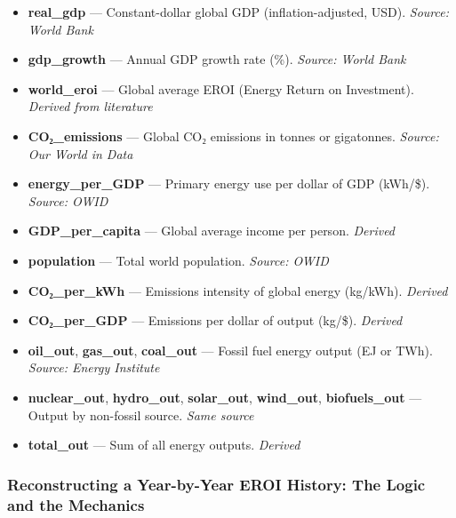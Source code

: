 \documentclass[a4paper,12pt]{article}
\begin{document}
\begin{itemize}
    \item \textbf{real\_gdp} — Constant-dollar global GDP (inflation-adjusted, USD). \textit{Source: World Bank}
    \item \textbf{gdp\_growth} — Annual GDP growth rate (\%). \textit{Source: World Bank}
    \item \textbf{world\_eroi} — Global average EROI (Energy Return on Investment). \textit{Derived from literature}
    \item \textbf{CO₂\_emissions} — Global CO₂ emissions in tonnes or gigatonnes. \textit{Source: Our World in Data}
    \item \textbf{energy\_per\_GDP} — Primary energy use per dollar of GDP (kWh/\$). \textit{Source: OWID}
    \item \textbf{GDP\_per\_capita} — Global average income per person. \textit{Derived}
    \item \textbf{population} — Total world population. \textit{Source: OWID}
    \item \textbf{CO₂\_per\_kWh} — Emissions intensity of global energy (kg/kWh). \textit{Derived}
    \item \textbf{CO₂\_per\_GDP} — Emissions per dollar of output (kg/\$). \textit{Derived}
    \item \textbf{oil\_out}, \textbf{gas\_out}, \textbf{coal\_out} — Fossil fuel energy output (EJ or TWh). \textit{Source: Energy Institute}
    \item \textbf{nuclear\_out}, \textbf{hydro\_out}, \textbf{solar\_out}, \textbf{wind\_out}, \textbf{biofuels\_out} — Output by non-fossil source. \textit{Same source}
    \item \textbf{total\_out} — Sum of all energy outputs. \textit{Derived}
\end{itemize}


\subsubsection{Reconstructing a Year-by-Year EROI History: The Logic and the Mechanics}
\end{document}
